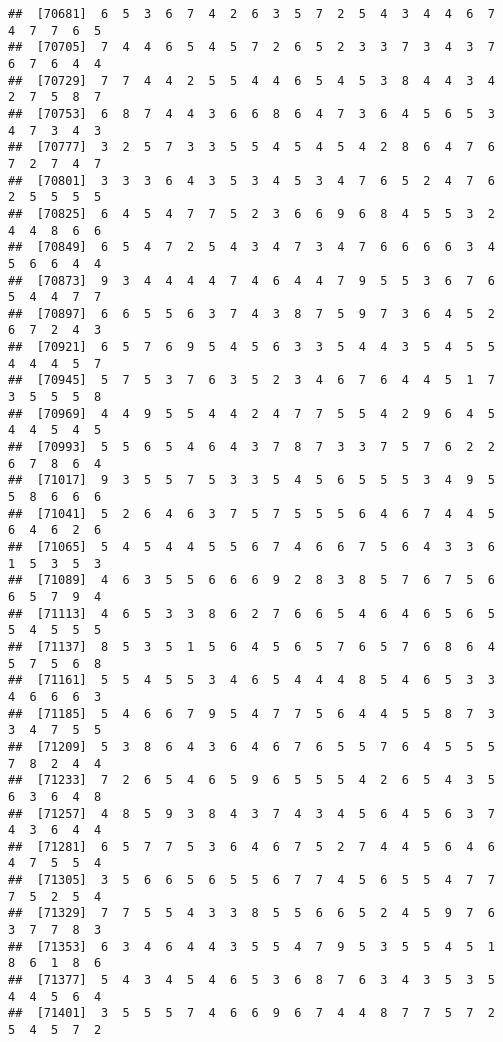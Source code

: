 \documentclass[
]{book}
\begin{document}
\begin{verbatim}
##  [70681]  6  5  3  6  7  4  2  6  3  5  7  2  5  4  3  4  4  6  7  4  7  7  6  5
##  [70705]  7  4  4  6  5  4  5  7  2  6  5  2  3  3  7  3  4  3  7  6  7  6  4  4
##  [70729]  7  7  4  4  2  5  5  4  4  6  5  4  5  3  8  4  4  3  4  2  7  5  8  7
##  [70753]  6  8  7  4  4  3  6  6  8  6  4  7  3  6  4  5  6  5  3  4  7  3  4  3
##  [70777]  3  2  5  7  3  3  5  5  4  5  4  5  4  2  8  6  4  7  6  7  2  7  4  7
##  [70801]  3  3  3  6  4  3  5  3  4  5  3  4  7  6  5  2  4  7  6  2  5  5  5  5
##  [70825]  6  4  5  4  7  7  5  2  3  6  6  9  6  8  4  5  5  3  2  4  4  8  6  6
##  [70849]  6  5  4  7  2  5  4  3  4  7  3  4  7  6  6  6  6  3  4  5  6  6  4  4
##  [70873]  9  3  4  4  4  4  7  4  6  4  4  7  9  5  5  3  6  7  6  5  4  4  7  7
##  [70897]  6  6  5  5  6  3  7  4  3  8  7  5  9  7  3  6  4  5  2  6  7  2  4  3
##  [70921]  6  5  7  6  9  5  4  5  6  3  3  5  4  4  3  5  4  5  5  4  4  4  5  7
##  [70945]  5  7  5  3  7  6  3  5  2  3  4  6  7  6  4  4  5  1  7  3  5  5  5  8
##  [70969]  4  4  9  5  5  4  4  2  4  7  7  5  5  4  2  9  6  4  5  4  4  5  4  5
##  [70993]  5  5  6  5  4  6  4  3  7  8  7  3  3  7  5  7  6  2  2  6  7  8  6  4
##  [71017]  9  3  5  5  7  5  3  3  5  4  5  6  5  5  5  3  4  9  5  5  8  6  6  6
##  [71041]  5  2  6  4  6  3  7  5  7  5  5  5  6  4  6  7  4  4  5  6  4  6  2  6
##  [71065]  5  4  5  4  4  5  5  6  7  4  6  6  7  5  6  4  3  3  6  1  5  3  5  3
##  [71089]  4  6  3  5  5  6  6  6  9  2  8  3  8  5  7  6  7  5  6  6  5  7  9  4
##  [71113]  4  6  5  3  3  8  6  2  7  6  6  5  4  6  4  6  5  6  5  5  4  5  5  5
##  [71137]  8  5  3  5  1  5  6  4  5  6  5  7  6  5  7  6  8  6  4  5  7  5  6  8
##  [71161]  5  5  4  5  5  3  4  6  5  4  4  4  8  5  4  6  5  3  3  4  6  6  6  3
##  [71185]  5  4  6  6  7  9  5  4  7  7  5  6  4  4  5  5  8  7  3  3  4  7  5  5
##  [71209]  5  3  8  6  4  3  6  4  6  7  6  5  5  7  6  4  5  5  5  7  8  2  4  4
##  [71233]  7  2  6  5  4  6  5  9  6  5  5  5  4  2  6  5  4  3  5  6  3  6  4  8
##  [71257]  4  8  5  9  3  8  4  3  7  4  3  4  5  6  4  5  6  3  7  4  3  6  4  4
##  [71281]  6  5  7  7  5  3  6  4  6  7  5  2  7  4  4  5  6  4  6  4  7  5  5  4
##  [71305]  3  5  6  6  5  6  5  5  6  7  7  4  5  6  5  5  4  7  7  7  5  2  5  4
##  [71329]  7  7  5  5  4  3  3  8  5  5  6  6  5  2  4  5  9  7  6  3  7  7  8  3
##  [71353]  6  3  4  6  4  4  3  5  5  4  7  9  5  3  5  5  4  5  1  8  6  1  8  6
##  [71377]  5  4  3  4  5  4  6  5  3  6  8  7  6  3  4  3  5  3  5  4  4  5  6  4
##  [71401]  3  5  5  5  7  4  6  6  9  6  7  4  4  8  7  7  5  7  2  5  4  5  7  2

\end{verbatim}
\end{document}
